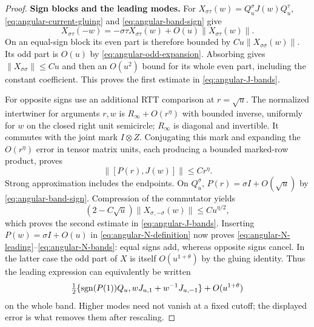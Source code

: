 \begin{proof}
\smallskip\noindent\textbf{Sign blocks and the leading modes.}
For $X_{\sigma\tau}(w)=Q_u^\sigma J(w)Q_u^\tau$,
\eqref{eq:angular-current-gluing} and
\eqref{eq:angular-band-sign} give
\[
 X_{\sigma\tau}(-w)=-\sigma\tau X_{\sigma\tau}(w)
                 +O(u)\|X_{\sigma\tau}(w)\|.
\]
On an equal-sign block its even part is therefore bounded by
$Cu\|X_{\sigma\sigma}(w)\|$.  Its odd part is $O(u)$ by
\eqref{eq:angular-odd-expansion}.  Absorbing gives
$\|X_{\sigma\sigma}\|\le Cu$ and then an $O(u^2)$ bound for its
whole even part, including the constant coefficient.  This proves the
first estimate in \eqref{eq:angular-J-bands}.

For opposite signs use an additional RTT comparison at $r=\sqrt u$.
The normalized intertwiner for arguments $r,w$ is
$R_\infty+O(r^\eta)$ with bounded inverse, uniformly for $w$ on the
closed right unit semicircle; $R_\infty$ is diagonal and invertible.
It commutes with the joint mark $I\otimes Z$.  Conjugating this mark
and expanding the $O(r^\eta)$ error in tensor matrix units, each
producing a bounded marked-row product, proves
\[
 \|[P(r),J(w)]\|\le Cr^\eta.
\]
Strong approximation includes the endpoints.  On $Q_u^\sigma$,
$P(r)=\sigma I+O(\sqrt u)$ by
\eqref{eq:angular-band-sign}.  Compression of the commutator yields
\[
 (2-C\sqrt u)\|X_{\sigma,-\sigma}(w)\|
 \le Cu^{\eta/2},
\]
which proves the second estimate in
\eqref{eq:angular-J-bands}.  Inserting
$P(w)=\sigma I+O(u)$ in \eqref{eq:angular-N-definition} now proves
\eqref{eq:angular-N-leading}--\eqref{eq:angular-N-bands}: equal signs
add, whereas opposite signs cancel.  In the latter case the odd part
of $X$ is itself $O(u^{1+\theta})$ by the gluing identity.  Thus the
leading expression can equivalently be written
\[
 \tfrac12\{\operatorname{sgn}(P(1))Q_u, wJ_{u,1}+w^{-1}J_{u,-1}\}
       +O(u^{1+\theta})
\]
on the whole band.  Higher modes need not vanish at a fixed cutoff;
the displayed error is what removes them after rescaling.


\end{proof}
